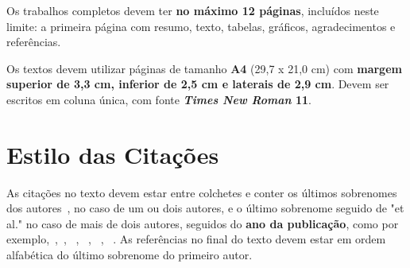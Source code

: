\documentclass[a4paper,11pt]{article}
\begin{document}
Os trabalhos completos devem ter \textbf{no m\'aximo 12 p\'aginas}, inclu\'idos neste limite: a primeira p\'agina com resumo, texto, tabelas, gr\'aficos, agradecimentos e refer\^encias.

Os textos devem utilizar p\'aginas de tamanho \textbf{A4} (29,7 x 21,0 cm) com \textbf{margem superior de 3,3 cm, inferior de 2,5 cm e laterais de 2,9 cm}.
 Devem ser escritos em coluna \'unica, com fonte \textbf{\textit{Times New Roman} 11}. 



\section{ Estilo das Cita\c c\~oes}


As cita\c c\~oes no texto devem estar entre colchetes e conter  os \'ultimos sobrenomes dos autores~\citep{silva:99}, no caso de um ou dois autores, e o \'ultimo sobrenome seguido de "et al." no caso de mais de dois autores, seguidos do \textbf{ano da publica\c c\~ao}, como por exemplo,~\citep{anna:06},~\citep{gates:03}, ~\citep{smith:02}, ~\citep{silva:99}, ~\citep{pele:04}, ~\citep{web:16}.
As refer\^encias no final do texto devem estar em ordem alfab\'etica do \'ultimo sobrenome do primeiro autor. 




\end{document}
